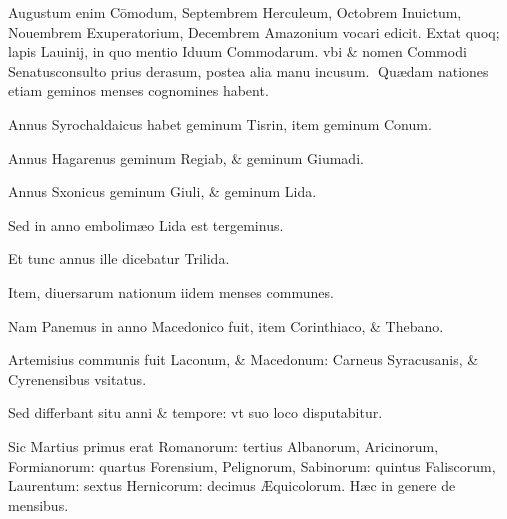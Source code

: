\begin{parnumbers}

Augustum enim Cōmodum, Septembrem Herculeum, Octobrem Inuictum, Nouembrem Exuperatorium, Decembrem Amazonium vocari edicit. Extat quoq; lapis Lauinij, in quo mentio Iduum Commodarum. vbi \& nomen Commodi Senatusconsulto prius derasum, postea alia manu  incusum.
Quædam nationes etiam geminos menses cognomines habent.

Annus Syrochaldaicus habet geminum Tisrin, item geminum Conum.

Annus Hagarenus geminum Regiab, \& geminum Giumadi.

Annus Sxonicus geminum Giuli, \& geminum Lida.

Sed in anno embolimæo Lida est tergeminus.

Et tunc annus ille dicebatur Trilida.

Item, diuersarum nationum iidem menses communes.

Nam Panemus in anno Macedonico fuit, item Corinthiaco, \& Thebano.

Artemisius communis fuit Laconum, \& Macedonum: Carneus Syracusanis, \& Cyrenensibus vsitatus.

Sed differbant situ anni \& tempore: vt suo loco disputabitur.

Sic Martius primus erat  Romanorum: tertius Albanorum, Aricinorum, Formianorum: quartus Forensium, Pelignorum, Sabinorum: quintus Faliscorum, Laurentum: sextus Hernicorum: decimus Æquicolorum. Hæc in genere de mensibus.

\end{parnumbers}

